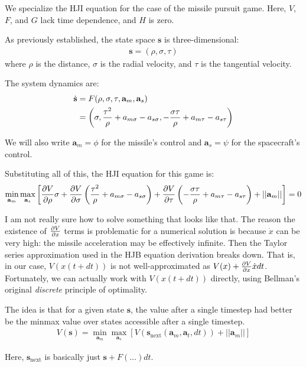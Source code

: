 \documentclass{article}
\renewcommand{\vec}[1]{\mathbf{#1}}
\begin{document}
We specialize the HJI equation for the case of the missile pursuit game.
Here, $V$, $F$, and $G$ lack time dependence, and $H$ is zero.

As previously established, the state space $\vec{s}$ is three-dimensional:
\begin{align}
\vec{s} = (\rho, \sigma, \tau)
\end{align}
where $\rho$ is the distance, $\sigma$ is the radial velocity, and $\tau$ is the
tangential velocity.

The system dynamics are:
\begin{align}
\dot{\vec{s}}
&= F(\rho, \sigma, \tau, \vec{a}_m, \vec{a}_s) \notag \\
&= \left(\sigma,
  \frac{\tau^2}{\rho} + a_{m\sigma} - a_{s\sigma},
  -\frac{\sigma\tau}{\rho} + a_{m\tau} - a_{s\tau}\right)
\end{align}

We will also write $\vec{a}_m = \phi$ for the missile's control and $\vec{a}_s =
\psi$ for the spacecraft's control.

Substituting all of this, the HJI equation for this game is:
\begin{align}
\min_{\vec{a}_m} \max_{\vec{a}_s} \left[
  \pdv{V}{\rho} \sigma
+ \pdv{V}{\sigma} \left(\frac{\tau^2}{\rho} + a_{m\sigma} - a_{s\sigma}\right)
+ \pdv{V}{\tau} \left(-\frac{\sigma\tau}{\rho} + a_{m\tau} - a_{s\tau}\right)
+ ||\vec{a}_m||
\right] = 0
\end{align}

I am not really sure how to solve something that looks like that.
The reason the existence of $\pdv{V}{x}$ terms is problematic for a numerical
solution is because $\dot{x}$ can be very high: the missile acceleration may be
effectively infinite.
Then the Taylor series approximation used in the HJB equation derivation breaks
down.
That is, in our case, $V(x(t + dt))$ is not well-approximated as $V(x) +
\pdv{V}{x} \dot{x} dt$.
Fortunately, we can actually work with $V(x(t + dt))$ directly, using Bellman's
original \textit{discrete} principle of optimality.

The idea is that for a given state $\vec{s}$, the value after a single timestep
had better be the minmax value over states accessible after a single timestep.
\begin{align}
V(\vec{s}) = \min_{\vec{a}_m} \max_{\vec{a}_s} \left[
  V(\vec{s}_\text{next}(\vec{a}_m, \vec{a}_t, dt)) +
  ||\vec{a}_m||
\right]
\end{align}

Here, $\vec{s}_\text{next}$ is basically just $\vec{s} + F(\dots) dt$.
\end{document}
